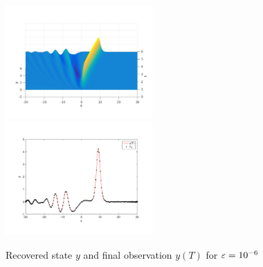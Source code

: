 \begin{figure}[htb]
 \includegraphics[width = 0.5\textwidth]{images/ex1recoveredstate3d.pdf}
  \includegraphics[width = 0.5\textwidth]{images/ex1recoveredstate.pdf}
 \caption{Recovered state $y$ and final observation $y(T)$ for $\varepsilon = 10^{-6}$}
 \label{recoveredstate}
\end{figure}

